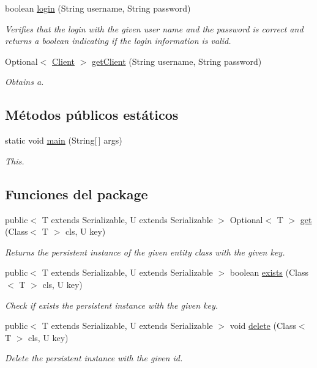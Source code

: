 \begin{DoxyCompactItemize}
boolean \mbox{\hyperlink{a00132_a7af883dece6a0de1e1be2b83e3d4a23f}{login}} (String username, String password)
\begin{DoxyCompactList}\small\item\em Verifies that the login with the given user name and the password is correct and returns a boolean indicating if the login information is valid. \end{DoxyCompactList}\item 
Optional$<$ \mbox{\hyperlink{a00164}{Client}} $>$ \mbox{\hyperlink{a00132_a249a902aa3507a04fb15ab5fcf1f082c}{get\+Client}} (String username, String password)
\begin{DoxyCompactList}\small\item\em Obtains a. \end{DoxyCompactList}\end{DoxyCompactItemize}
\subsection*{Métodos públicos estáticos}
\begin{DoxyCompactItemize}
\item 
static void \mbox{\hyperlink{a00132_a19d9b0706fe39437efc379c3bc747e06}{main}} (String\mbox{[}$\,$\mbox{]} args)
\begin{DoxyCompactList}\small\item\em This. \end{DoxyCompactList}\end{DoxyCompactItemize}
\subsection*{Funciones del \textquotesingle{}package\textquotesingle{}}
\begin{DoxyCompactItemize}
\item 
public$<$ T extends Serializable, U extends Serializable $>$ Optional$<$ T $>$ \mbox{\hyperlink{a00132_aab772c94cd469793cc01ec1418e29763}{get}} (Class$<$ T $>$ cls, U key)
\begin{DoxyCompactList}\small\item\em Returns the persistent instance of the given entity class with the given key. \end{DoxyCompactList}\item 
public$<$ T extends Serializable, U extends Serializable $>$ boolean \mbox{\hyperlink{a00132_a2a873fe74350d41be72c6fde461351fd}{exists}} (Class$<$ T $>$ cls, U key)
\begin{DoxyCompactList}\small\item\em Check if exists the persistent instance with the given key. \end{DoxyCompactList}\item 
public$<$ T extends Serializable, U extends Serializable $>$ void \mbox{\hyperlink{a00132_a9a11ee0688c0a679574bb3edb260f927}{delete}} (Class$<$ T $>$ cls, U key)
\begin{DoxyCompactList}\small\item\em Delete the persistent instance with the given id. \end{DoxyCompactList}\end{DoxyCompactItemize}
